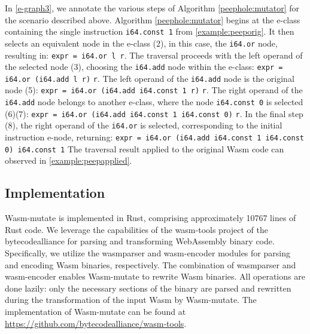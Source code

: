\documentclass[sigplan,screen]{acmart}
\newcommand*\badge[1]{ \colorbox{red}{\color{white}#1}}
\newcommand{\tool}{Wasm-mutate\xspace}
\newcommand{\todo}[1]{%
\refstepcounter{todo}
\noindent\textbf{\badge{TODO}} {\color{red}#1}
\addcontentsline{td}{todo}
{\color{red}\thesection.\thetodo\xspace #1}}
\begin{document}
In \autoref{e-graph3}, we annotate the various steps of Algorithm \ref{peephole:mutator} 
for the scenario  described above. Algorithm \ref{peephole:mutator} begins at the e-class containing the single instruction \texttt{i64.const 1} from \autoref{example:peeporig}. 
It then selects an equivalent node in the e-class (2), in this case, the \texttt{i64.or} node, resulting in:
{\texttt{expr = i64.or l r}}.
The traversal proceeds with the left operand of the selected node (3), choosing the \texttt{i64.add} node within the e-class: 
{\texttt{expr = i64.or (i64.add l r)} \texttt{r}}.
The left operand of the \texttt{i64.add} node is the original node (5): 
{\texttt{expr = i64.or (i64.add i64.const 1 r)} \texttt{r}}.
The right operand of the \texttt{i64.add} node belongs to another e-class, where the node \texttt{i64.const 0} is selected (6)(7):
{\texttt{expr = i64.or (i64.add i64.const 1 i64.const 0)} \texttt{r}}.
In the final step (8), the right operand of the \texttt{i64.or} is selected, corresponding to the initial instruction e-node, returning:
{\texttt{expr = i64.or (i64.add i64.const 1 i64.const 0)\ i64.const 1}}
The traversal result applied to the original Wasm code can observed in \autoref{example:peepapplied}. 



\subsection{Implementation}

\tool is implemented in Rust, comprising approximately 10767 lines of Rust code. 
We leverage the capabilities of the wasm-tools project of the bytecodealliance for parsing and transforming WebAssembly binary code. 
Specifically, we utilize the wasmparser and wasm-encoder modules for parsing and encoding Wasm binaries, respectively.
The combination of wasmparser and wasm-encoder enables \tool to rewrite Wasm binaries. 
All operations are done lazily: only the necessary sections of the binary are parsed and rewritten during the transformation of the input Wasm by \tool.
The implementation of \tool can be found at \url{https://github.com/bytecodealliance/wasm-tools}.




\end{document}
